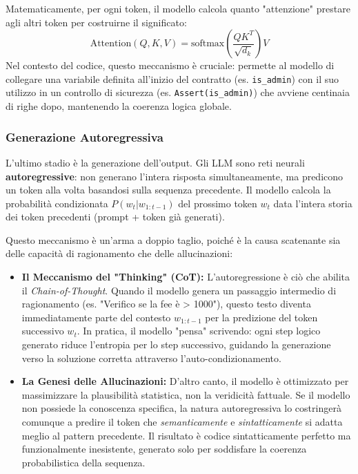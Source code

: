 Matematicamente, per ogni token, il modello calcola quanto "attenzione" prestare agli altri token per costruirne il significato:
$$
\text{Attention}(Q, K, V) = \text{softmax}\left(\frac{QK^T}{\sqrt{d_k}}\right)V
$$
Nel contesto del codice, questo meccanismo è cruciale: permette al modello di collegare una variabile definita all'inizio del contratto (es. \texttt{is\_admin}) con il suo utilizzo in un controllo di sicurezza (es. \texttt{Assert(is\_admin)}) che avviene centinaia di righe dopo, mantenendo la coerenza logica globale.

\subsubsection{Generazione Autoregressiva}
L'ultimo stadio è la generazione dell'output. Gli LLM sono reti neurali \textbf{autoregressive}: non generano l'intera risposta simultaneamente, ma predicono un token alla volta basandosi sulla sequenza precedente.
Il modello calcola la probabilità condizionata $P(w_t | w_{1:t-1})$ del prossimo token $w_t$ data l'intera storia dei token precedenti (prompt + token già generati).

Questo meccanismo è un'arma a doppio taglio, poiché è la causa scatenante sia delle capacità di ragionamento che delle allucinazioni:

\begin{itemize}
    \item \textbf{Il Meccanismo del "Thinking" (CoT):} L'autoregressione è ciò che abilita il \textit{Chain-of-Thought}. Quando il modello genera un passaggio intermedio di ragionamento (es. "Verifico se la fee è > 1000"), questo testo diventa immediatamente parte del contesto $w_{1:t-1}$ per la predizione del token successivo $w_t$. In pratica, il modello "pensa" scrivendo: ogni step logico generato riduce l'entropia per lo step successivo, guidando la generazione verso la soluzione corretta attraverso l'auto-condizionamento.
    
    \item \textbf{La Genesi delle Allucinazioni:} D'altro canto, il modello è ottimizzato per massimizzare la plausibilità statistica, non la veridicità fattuale. Se il modello non possiede la conoscenza specifica, la natura autoregressiva lo costringerà comunque a predire il token che \textit{semanticamente} e \textit{sintatticamente} si adatta meglio al pattern precedente. Il risultato è codice sintatticamente perfetto ma funzionalmente inesistente, generato solo per soddisfare la coerenza probabilistica della sequenza.
\end{itemize}

